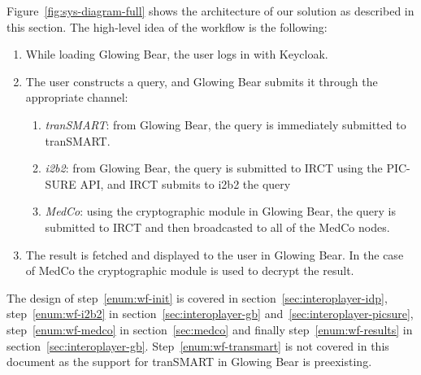 Figure~\ref{fig:sys-diagram-full} shows the architecture of our solution as described in this section.
The high-level idea of the workflow is the following:
\begin{enumerate}
    \item \label{enum:wf-init} While loading Glowing Bear, the user logs in with Keycloak.
    \item The user constructs a query, and Glowing Bear submits it through the appropriate channel:
    \begin{enumerate}
        \item \label{enum:wf-transmart} \emph{tranSMART}: from Glowing Bear, the query is immediately submitted to tranSMART.
        \item \label{enum:wf-i2b2} \emph{i2b2}: from Glowing Bear, the query is submitted to IRCT using the PIC-SURE API, and IRCT submits to i2b2 the query
        \item \label{enum:wf-medco} \emph{MedCo}: using the cryptographic module in Glowing Bear, the query is submitted to IRCT and then broadcasted to all of the MedCo nodes.
    \end{enumerate}
    \item \label{enum:wf-results} The result is fetched and displayed to the user in Glowing Bear. In the case of MedCo the cryptographic module is used to decrypt the result.
\end{enumerate}

The design of step~\ref{enum:wf-init} is covered in section~\ref{sec:interoplayer-idp}, 
step~\ref{enum:wf-i2b2} in section~\ref{sec:interoplayer-gb} and~\ref{sec:interoplayer-picsure}, 
step~\ref{enum:wf-medco} in section~\ref{sec:medco} and finally 
step~\ref{enum:wf-results} in section~\ref{sec:interoplayer-gb}.
Step~\ref{enum:wf-transmart} is not covered in this document as the support for tranSMART in Glowing Bear is preexisting.

